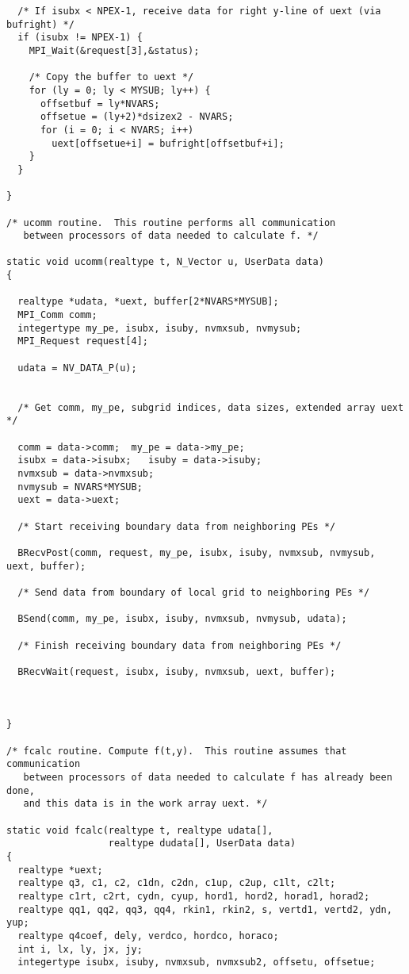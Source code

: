 \begin{verbatim}
  /* If isubx < NPEX-1, receive data for right y-line of uext (via bufright) */
  if (isubx != NPEX-1) {
    MPI_Wait(&request[3],&status);

    /* Copy the buffer to uext */
    for (ly = 0; ly < MYSUB; ly++) {
      offsetbuf = ly*NVARS;
      offsetue = (ly+2)*dsizex2 - NVARS;
      for (i = 0; i < NVARS; i++)
        uext[offsetue+i] = bufright[offsetbuf+i];
    }
  }

}

/* ucomm routine.  This routine performs all communication 
   between processors of data needed to calculate f. */

static void ucomm(realtype t, N_Vector u, UserData data)
{

  realtype *udata, *uext, buffer[2*NVARS*MYSUB];
  MPI_Comm comm;
  integertype my_pe, isubx, isuby, nvmxsub, nvmysub;
  MPI_Request request[4];

  udata = NV_DATA_P(u);


  /* Get comm, my_pe, subgrid indices, data sizes, extended array uext */

  comm = data->comm;  my_pe = data->my_pe;
  isubx = data->isubx;   isuby = data->isuby;
  nvmxsub = data->nvmxsub;
  nvmysub = NVARS*MYSUB;
  uext = data->uext;

  /* Start receiving boundary data from neighboring PEs */

  BRecvPost(comm, request, my_pe, isubx, isuby, nvmxsub, nvmysub, uext, buffer);

  /* Send data from boundary of local grid to neighboring PEs */

  BSend(comm, my_pe, isubx, isuby, nvmxsub, nvmysub, udata);

  /* Finish receiving boundary data from neighboring PEs */

  BRecvWait(request, isubx, isuby, nvmxsub, uext, buffer);



}

/* fcalc routine. Compute f(t,y).  This routine assumes that communication 
   between processors of data needed to calculate f has already been done,
   and this data is in the work array uext. */

static void fcalc(realtype t, realtype udata[],
                  realtype dudata[], UserData data)
{
  realtype *uext;
  realtype q3, c1, c2, c1dn, c2dn, c1up, c2up, c1lt, c2lt;
  realtype c1rt, c2rt, cydn, cyup, hord1, hord2, horad1, horad2;
  realtype qq1, qq2, qq3, qq4, rkin1, rkin2, s, vertd1, vertd2, ydn, yup;
  realtype q4coef, dely, verdco, hordco, horaco;
  int i, lx, ly, jx, jy;
  integertype isubx, isuby, nvmxsub, nvmxsub2, offsetu, offsetue;


\end{verbatim}
